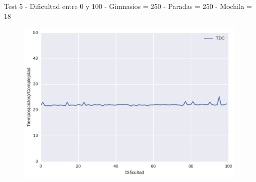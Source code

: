 Test 5 - 
Dificultad entre 0 y 100 - 
Gimnasios = 250 - 
Paradas = 250 - 
Mochila = 18

\begin{figure}[H]
  \begin{center}
    \includegraphics[scale=0.4]{imagenes/ej2test5iempos.pdf}
    \caption{}
    \label{}
  \end{center}
\end{figure}